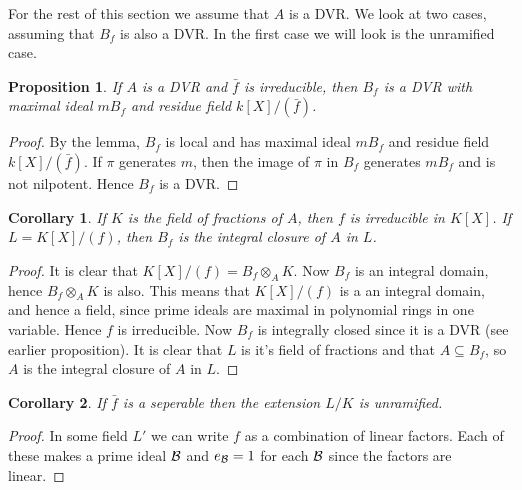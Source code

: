 \documentclass[11pt]{article} %
\newtheorem{cor}{Corollary}
\newtheorem{prop}{Proposition}
\theoremstyle{remark}\newtheorem*{rem}{Remark}
\begin{document}
For the rest of this section we assume that $A$ is a DVR. We look at two cases, assuming that $B_f$ is also a DVR.
In the first case we will look is the unramified case.

\begin{prop}
If $A$ is a DVR and $\bar f$ is irreducible, then $B_f$ is a DVR with maximal ideal $mB_f$ and residue field $k[X]/(\bar f)$.
\end{prop}
\begin{proof}
By the lemma, $B_f$ is local and has maximal ideal $mB_f$ and residue field $k[X]/(\bar f)$.
If $\pi$ generates $m$, then the image of $\pi$ in $B_f$ generates $mB_f$ and is not nilpotent.
Hence $B_f$ is a DVR.
\end{proof}

\begin{cor}
If $K$ is the field of fractions of $A$, then $f$ is irreducible in $K[X]$.
If $L=K[X]/(f)$, then $B_f$ is the integral closure of $A$ in $L$.
\end{cor}
\begin{proof}
It is clear that $K[X]/(f) = B_f\otimes_A K$.
Now $B_f$ is an integral domain, hence $B_f\otimes_A K$ is also.
This means that $K[X]/(f)$ is a an integral domain, and hence a field, since prime ideals are maximal in polynomial rings in one variable.
Hence $f$ is irreducible.
Now $B_f$ is integrally closed since it is a DVR (see earlier proposition).
It is clear that $L$ is it's field of fractions and that $A\subseteq B_f$, so $A$ is the integral closure of $A$ in $L$.
\end{proof}

\begin{cor}
If $\bar f$ is a seperable then the extension $L/K$ is unramified.
\end{cor}
\begin{proof}
In some field $L'$ we can write $f$ as a combination of linear factors.
Each of these makes a prime ideal $\cal B$ and $e_{\cal B} = 1$ for each $\cal B$ since the factors are linear.
\end{proof}
\end{document}
